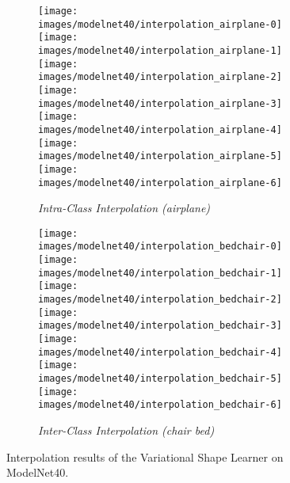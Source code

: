\documentclass[10pt,twocolumn,letterpaper]{article}
\begin{document}
\begin{figure*}[ht!]
  \vspace{-0.5em}
  \centering
  \begin{subfigure}[b]{\textwidth}
    \centering
    \texttt{[image: images/modelnet40/interpolation\_airplane-0]}\qquad \texttt{[image: images/modelnet40/interpolation\_airplane-1]}\qquad \texttt{[image: images/modelnet40/interpolation\_airplane-2]}\qquad \texttt{[image: images/modelnet40/interpolation\_airplane-3]}\qquad \texttt{[image: images/modelnet40/interpolation\_airplane-4]}\qquad \texttt{[image: images/modelnet40/interpolation\_airplane-5]}\qquad \texttt{[image: images/modelnet40/interpolation\_airplane-6]}\qquad \caption*{\it Intra-Class Interpolation (airplane)}
  \end{subfigure}
  \quad
  \begin{subfigure}[b]{\textwidth}
    \centering
    \texttt{[image: images/modelnet40/interpolation\_bedchair-0]}\qquad \texttt{[image: images/modelnet40/interpolation\_bedchair-1]}\qquad \texttt{[image: images/modelnet40/interpolation\_bedchair-2]}\qquad \texttt{[image: images/modelnet40/interpolation\_bedchair-3]}\qquad \texttt{[image: images/modelnet40/interpolation\_bedchair-4]}\qquad \texttt{[image: images/modelnet40/interpolation\_bedchair-5]}\qquad \texttt{[image: images/modelnet40/interpolation\_bedchair-6]}\qquad \caption*{\it Inter-Class Interpolation (chair  bed)}
  \end{subfigure}
  \caption{Interpolation results of the Variational Shape Learner on ModelNet40.}
  \label{fig:shapeinterp}
\end{figure*}
\end{document}
